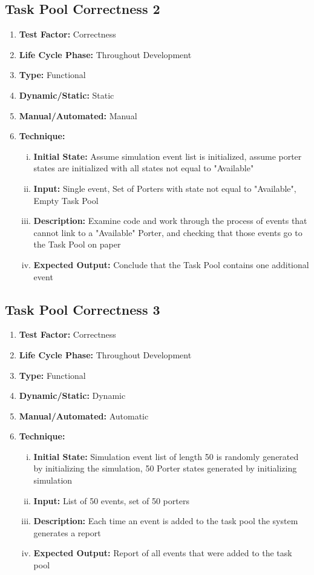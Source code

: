 \documentclass[paper=letter, fontsize=10pt]{scrartcl}
\numberwithin{equation}{section}		%
\numberwithin{figure}{section}			%
\numberwithin{table}{section}				%
\begin{document}
\subsection{Task Pool Correctness 2}
\begin{enumerate}[]
	\item \textbf{Test Factor:} Correctness
	\item \textbf{Life Cycle Phase:} Throughout Development
	\item \textbf{Type:} Functional
	\item \textbf{Dynamic/Static:} Static
	\item \textbf{Manual/Automated:} Manual
	\item \textbf{Technique:}
		\begin{enumerate}[(i)]
			\item \textbf{Initial State:} Assume simulation event list is initialized, assume porter states are initialized with all states not equal to "Available"
			\item \textbf{Input:} Single event, Set of Porters with state not equal to "Available", Empty Task Pool
			\item \textbf{Description:} Examine code and work through the process of events that cannot link to a "Available" Porter, and checking that those events go to the Task Pool on paper
			\item \textbf{Expected Output:} Conclude that the Task Pool contains one additional event 
		\end{enumerate}
\end{enumerate}

\subsection{Task Pool Correctness 3}
\begin{enumerate}[]
	\item \textbf{Test Factor:} Correctness
	\item \textbf{Life Cycle Phase:} Throughout Development
	\item \textbf{Type:} Functional
	\item \textbf{Dynamic/Static:} Dynamic
	\item \textbf{Manual/Automated:} Automatic
	\item \textbf{Technique:}
		\begin{enumerate}[(i)]
			\item \textbf{Initial State:} Simulation event list of length 50 is randomly generated by initializing the simulation, 50 Porter states generated by initializing simulation
			\item \textbf{Input:} List of 50 events, set of 50 porters
			\item \textbf{Description:} Each time an event is added to the task pool the system generates a report
			\item \textbf{Expected Output:} Report of all events that were added to the task pool
		\end{enumerate}
\end{enumerate}
\end{document}
